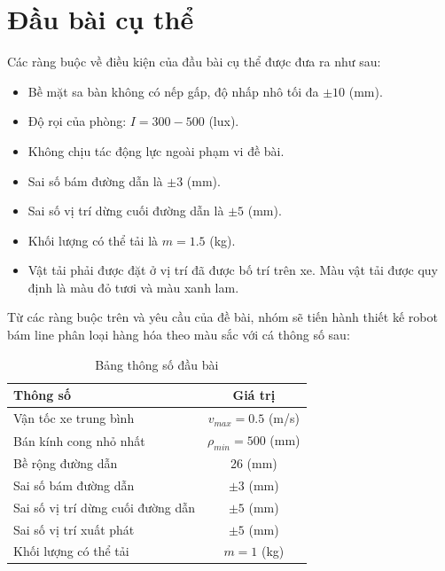     \section{Đầu bài cụ thể}
        \hspace*{0.6cm}Các ràng buộc về điều kiện của đầu bài cụ thể được đưa ra như sau:
        \begin{itemize}
            \item Bề mặt sa bàn không có nếp gấp, độ nhấp nhô tối đa $\pm 10$ (mm).
            \item Độ rọi của phòng: $I = 300 - 500$ (lux).
            \item Không chịu tác động lực ngoài phạm vi đề bài.
            \item Sai số bám đường dẫn là $\pm 3$ (mm).
            \item Sai số vị trí dừng cuối đường dẫn là $\pm 5$ (mm).
            \item Khối lượng có thể tải là $m = 1.5$ (kg).
            \item Vật tải phải được đặt ở vị trí đã được bố trí trên xe. Màu vật tải được quy định là màu đỏ tươi và màu xanh lam.
        \end{itemize}
        \hspace*{0.6cm}Từ các ràng buộc trên và yêu cầu của đề bài, nhóm sẽ tiến hành thiết kế robot bám line phân loại hàng hóa theo màu sắc với cá thông số sau:
        \begin{table}[H]
            \centering
            \caption{Bảng thông số đầu bài}
            \begin{tabular}{|l|c|}
            \hline
            \centering \textbf{Thông số} & \textbf{Giá trị} \\
            \hline
            Vận tốc xe trung bình & $v_{max} = 0.5$ (m/s) \\
            \hline
            Bán kính cong nhỏ nhất & $\rho_{min} = 500$ (mm) \\
            \hline
            Bề rộng đường dẫn & 26 (mm) \\
            \hline
            Sai số bám đường dẫn & $\pm 3$ (mm) \\
            \hline
            Sai số vị trí dừng cuối đường dẫn & $\pm 5$ (mm) \\
            \hline
            Sai số vị trí xuất phát & $\pm 5$ (mm) \\
            \hline
            Khối lượng có thể tải & $m = 1$ (kg) \\
            \hline
            \end{tabular}
        \end{table}





    